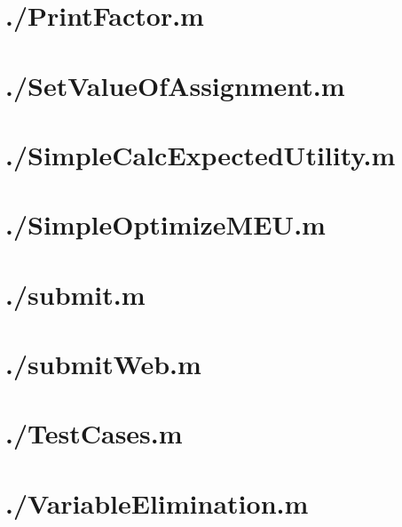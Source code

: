 \documentclass{article}
\begin{document}
\section{./PrintFactor.m}

\section{./SetValueOfAssignment.m}

\section{./SimpleCalcExpectedUtility.m}

\section{./SimpleOptimizeMEU.m}

\section{./submit.m}

\section{./submitWeb.m}

\section{./TestCases.m}

\section{./VariableElimination.m}

\end{document}
